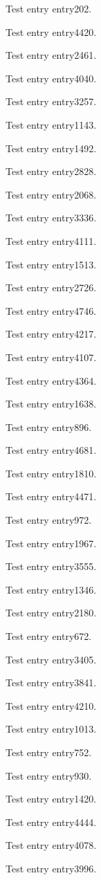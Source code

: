 Test entry \gls{entry202}.

Test entry \gls{entry4420}.

Test entry \gls{entry2461}.

Test entry \gls{entry4040}.

Test entry \gls{entry3257}.

Test entry \gls{entry1143}.

Test entry \gls{entry1492}.

Test entry \gls{entry2828}.

Test entry \gls{entry2068}.

Test entry \gls{entry3336}.

Test entry \gls{entry4111}.

Test entry \gls{entry1513}.

Test entry \gls{entry2726}.

Test entry \gls{entry4746}.

Test entry \gls{entry4217}.

Test entry \gls{entry4107}.

Test entry \gls{entry4364}.

Test entry \gls{entry1638}.

Test entry \gls{entry896}.

Test entry \gls{entry4681}.

Test entry \gls{entry1810}.

Test entry \gls{entry4471}.

Test entry \gls{entry972}.

Test entry \gls{entry1967}.

Test entry \gls{entry3555}.

Test entry \gls{entry1346}.

Test entry \gls{entry2180}.

Test entry \gls{entry672}.

Test entry \gls{entry3405}.

Test entry \gls{entry3841}.

Test entry \gls{entry4210}.

Test entry \gls{entry1013}.

Test entry \gls{entry752}.

Test entry \gls{entry930}.

Test entry \gls{entry1420}.

Test entry \gls{entry4444}.

Test entry \gls{entry4078}.

Test entry \gls{entry3996}.

